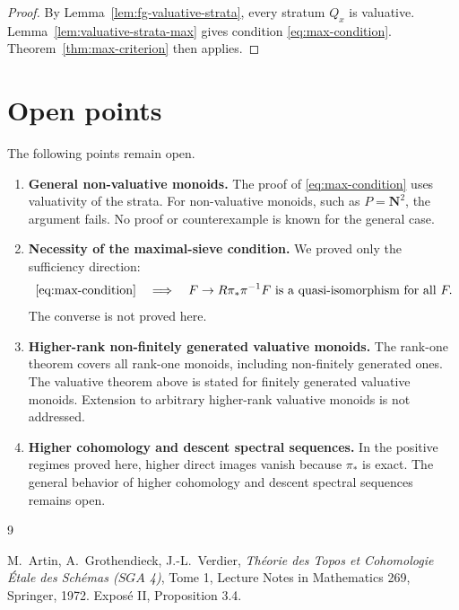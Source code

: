 \documentclass[12pt]{article}
\theoremstyle{definition}
\theoremstyle{remark}
\numberwithin{equation}{section}
\begin{document}
\begin{proof}
By Lemma~\ref{lem:fg-valuative-strata}, every stratum \(Q_x\) is valuative.  Lemma~\ref{lem:valuative-strata-max} gives condition \eqref{eq:max-condition}.  Theorem~\ref{thm:max-criterion} then applies.
\end{proof}

\section{Open points}\label{sec:open}

The following points remain open.

\begin{enumerate}[label=(\arabic*)]
\item \textbf{General non-valuative monoids.}  The proof of \eqref{eq:max-condition} uses valuativity of the strata.  For non-valuative monoids, such as \(P=\mathbf N^2\), the argument fails.  No proof or counterexample is known for the general case.

\item \textbf{Necessity of the maximal-sieve condition.}  We proved only the sufficiency direction:
\[
\eqref{eq:max-condition}\quad\Longrightarrow\quad
F\to R\pi_*\pi^{-1}F\text{ is a quasi-isomorphism for all }F.
\]
The converse is not proved here.

\item \textbf{Higher-rank non-finitely generated valuative monoids.}  The rank-one theorem covers all rank-one monoids, including non-finitely generated ones.  The valuative theorem above is stated for finitely generated valuative monoids.  Extension to arbitrary higher-rank valuative monoids is not addressed.

\item \textbf{Higher cohomology and descent spectral sequences.}  In the positive regimes proved here, higher direct images vanish because \(\pi_*\) is exact.  The general behavior of higher cohomology and descent spectral sequences remains open.
\end{enumerate}

\begin{thebibliography}{9}

M.~Artin, A.~Grothendieck, J.-L.~Verdier,
\emph{Th\'eorie des Topos et Cohomologie \'{E}tale des Sch\'emas (\(SGA\) 4)},
Tome 1, Lecture Notes in Mathematics 269, Springer, 1972.
Expos\'e II, Proposition 3.4.

\end{thebibliography}
\end{document}
